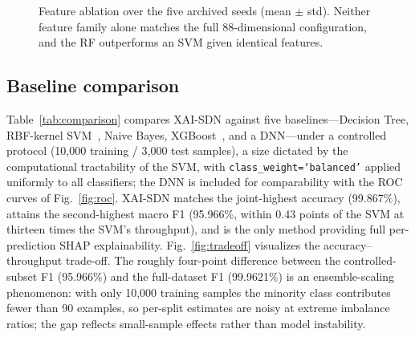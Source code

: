 ﻿\documentclass[review,12pt]{elsarticle}
\begin{document}
\begin{figure}[!t]
\centering
{}
\caption{Feature ablation over the five archived seeds (mean $\pm$ std). Neither feature family alone matches the full 88-dimensional configuration, and the RF outperforms an SVM given identical features.}
\label{fig:ablation}
\end{figure}

\subsection{Baseline comparison}
Table~\ref{tab:comparison} compares XAI-SDN against five baselines---Decision Tree, RBF-kernel SVM~\cite{cortes1995svm}, Naive Bayes, XGBoost~\cite{chen2016xgboost}, and a DNN---under a controlled protocol (10,000 training / 3,000 test samples), a size dictated by the computational tractability of the SVM, with \texttt{class\_weight=`balanced'} applied uniformly to all classifiers; the DNN is included for comparability with the ROC curves of Fig.~\ref{fig:roc}. XAI-SDN matches the joint-highest accuracy (99.867\%), attains the second-highest macro F1 (95.966\%, within 0.43 points of the SVM at thirteen times the SVM's throughput), and is the only method providing full per-prediction SHAP explainability. Fig.~\ref{fig:tradeoff} visualizes the accuracy--throughput trade-off. The roughly four-point difference between the controlled-subset F1 (95.966\%) and the full-dataset F1 (99.9621\%) is an ensemble-scaling phenomenon: with only 10,000 training samples the minority class contributes fewer than 90 examples, so per-split estimates are noisy at extreme imbalance ratios; the gap reflects small-sample effects rather than model instability.
\end{document}
